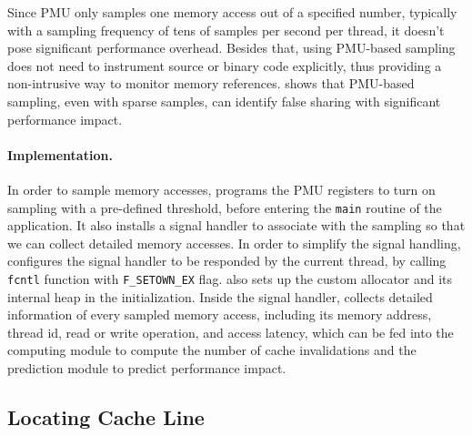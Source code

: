 Since PMU only samples one memory access out of a specified number, typically with a sampling frequency of tens of samples per second per thread, it doesn't pose significant performance overhead. Besides that, using PMU-based sampling does not need to instrument source or binary code explicitly, thus providing a non-intrusive way to monitor memory references. \cheetah{} shows that PMU-based sampling, even with sparse samples, can identify false sharing with significant performance impact.
 

\paragraph{Implementation.} 

In order to sample memory accesses, \cheetah{} programs the PMU registers to turn on sampling with a pre-defined threshold, before entering the \texttt{main} routine of the application. It also installs a signal handler to associate with the sampling so that we can collect detailed memory accesses. In order to simplify the signal handling, \Cheetah{} configures the signal handler to be responded by the current thread, by calling \texttt{fcntl} function with \texttt{F\_SETOWN\_EX} flag. \cheetah{} also sets up the custom allocator and its internal heap in the initialization.
Inside the signal handler, \Cheetah{} collects detailed information of every sampled memory access, including its memory address, thread id, read or write operation, and access latency, which can be fed into the computing module to compute the number of cache invalidations and the prediction module to predict performance impact.

\subsection{Locating Cache Line}
\label{sec:shadow}


